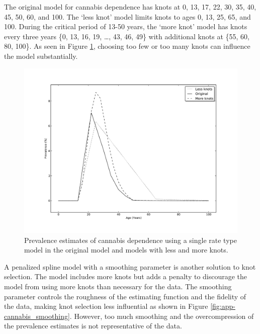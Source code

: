 The original model for cannabis dependence has knots at 0, 13, 17, 22, 30, 35, 40, 45, 50, 60, and 100.  The `less knot' model limits knots to ages 0, 13, 25, 65, and 100.   During the critical period of 13-50 years, the `more knot' model has knots every three years \{0, 13, 16, 19, \ldots, 43, 46, 49\} with additional knots at \{55, 60, 80, 100\}.  As seen in Figure \ref{fig:app-cannabis_knots}, choosing too few or too many knots can influence the model substantially.

    \begin{figure}[h]
        \begin{center}
            \includegraphics[width=\textwidth]{applications/cannabis_dependence-knots.pdf}
            \caption{Prevalence estimates of cannabis dependence using a single rate type model in the original model and models with less and more knots. }
        \label{fig:app-cannabis_knots}
        \end{center}
    \end{figure}

A penalized spline model with a smoothing parameter is another solution to knot selection.  The model includes more knots but adds a penalty to discourage the model from using more knots than necessary for the data.  The smoothing parameter controls the roughness of the estimating function and the fidelity of the data, making knot selection less influential as shown in Figure \ref{fig:app-cannabis_smoothing}.  However, too much smoothing and the overcompression of the prevalence estimates is not representative of the data.

